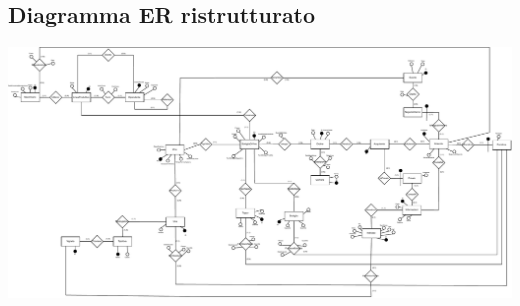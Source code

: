 \subsection{Diagramma ER ristrutturato}
\centerline{\includegraphics[width=18cm,keepaspectratio,angle=0]{src/progettazioneLogica/cantina_ER_ristrutturato.pdf}}